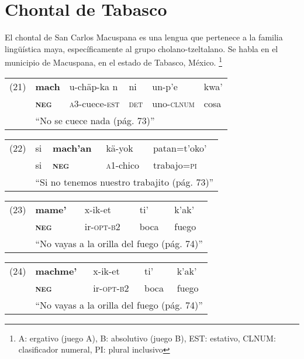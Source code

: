 \section*{Chontal de Tabasco}

\noindent El chontal de San Carlos Macuspana es una lengua que pertenece a la familia lingüística maya, específicamente al grupo cholano-tzeltalano. Se habla en el municipio de Macuspana, en el estado de Tabasco, México.
\footnote{A: ergativo (juego A), B: absolutivo (juego B), EST: estativo, CLNUM: clasificador numeral, PI: plural inclusivo}
\vspace{0.5cm}

{\setmainfont{Charis SIL} 

\begin{tabular}{llllll}
(21) & \textbf{mach} & u-chäp-ka n& ni & un-p'e & kwa' \\
& \textsc{\textbf{neg}} & \textsc{a3}-cuece-\textsc{est} & \textsc{det} & uno-\textsc{clnum} & cosa \\
& \multicolumn{5}{l}{``No se cuece nada (pág. 73)''} \\
\end{tabular} \vspace{0.3cm}

\begin{tabular}{lllll}
(22) & si & \textbf{mach'an} & kä-yok  & patan=t'oko'\\
& si & \textsc{\textbf{neg}} & \textsc{a1}-chico & trabajo=\textsc{pi}\\
& \multicolumn{4}{l}{``Si no tenemos nuestro trabajito (pág. 73)''} \\
\end{tabular} \vspace{0.3cm}

\begin{tabular}{lllll}
(23) & \textbf{mame'} & x-ik-et & ti' & k'ak' \\
& \textsc{\textbf{neg}} & ir-\textsc{opt-b2} & boca & fuego\\
& \multicolumn{4}{l}{``No vayas a la orilla del fuego (pág. 74)''} \\
\end{tabular} \vspace{0.3cm}

\begin{tabular}{lllll}
(24) & \textbf{machme'} & x-ik-et & ti' & k'ak' \\
& \textsc{\textbf{neg}} & ir-\textsc{opt-b2} & boca & fuego\\
& \multicolumn{4}{l}{``No vayas a la orilla del fuego (pág. 74)''} \\
\end{tabular} \vspace{0.3cm}

}

